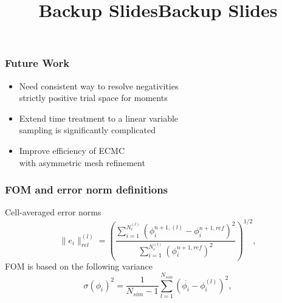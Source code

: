 \documentclass[xcolor=dvipsnames,hyperref={pdfpagelabels=false},unknownkeysallowed]{beamer}
\newcommand{\ds}[0]{\displaystyle}
\newcommand{\colG}[1]{{\color{Gray!110} #1}}
\newlength{\wideitemsep}
\let\olditem\item
\renewcommand{\item}{\setlength{\itemsep}{\wideitemsep}\olditem}
\begin{document}
\begin{frame}
    \frametitle{Future Work}
    \begin{itemize}
        \item[] Need consistent way to resolve negativities
            \\ \colG{strictly positive trial space for moments}
        \item[] Extend time treatment to a linear variable
            \\ \colG{sampling is significantly complicated}
        \item[] Improve efficiency of ECMC \\ with asymmetric mesh refinement
    \end{itemize}
\end{frame}

\appendix
{}
\setcounter{finalframe}{\value{framenumber}}
\date{}
\title{Backup Slides}
\begin{frame}
    \vspace{-0.21in}
    \titlepage \vspace{-0.2113in}
\end{frame}

\title{Backup Slides}
\author{}
\date{}




\begin{frame}
    \frametitle{FOM and error norm definitions}
    Cell-averaged error norms
\begin{equation}
    \|e_i\|^{{(l)}}_{rel} = \left({\frac{\ds \sum\limits_{i=1}^{N^{(l)}_c}
    \left(\phi_i^{n+1,{(l)}} - \phi_i^{n+1,ref}
\right)^2}{\ds \sum\limits_{i=1}^{N^{(l)}_c}\left(\phi_i^{n+1,ref}\right)^2}}\right)^{1/2},
\end{equation}
FOM is based on the following variance
\begin{equation} 
    \sigma(\phi_i)^2 =  \frac{1}{N_{sim}-1} \sum_{l=1}^{N_{sim}} \left(\overline{\phi_{i}} -
    \phi_{i}^{(l)}\right)^2,
\end{equation}
\end{frame}
\end{document}
